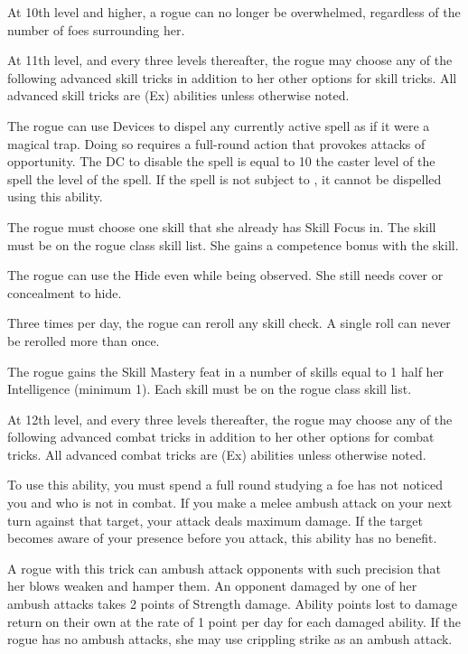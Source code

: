  At 10th level and higher, a rogue can no longer be overwhelmed, regardless of the number of foes surrounding her.

 At 11th level, and every three levels thereafter, the rogue may choose any of the following advanced skill tricks in addition to her other options for skill tricks. All advanced skill tricks are (Ex) abilities unless otherwise noted.

 The rogue can use Devices to dispel any currently active spell as if it were a magical trap. Doing so requires a full-round action that provokes attacks of opportunity. The DC to disable the spell is equal to 10 \add the caster level of the spell \add the level of the spell. If the spell is not subject to , it cannot be dispelled using this ability.

 The rogue must choose one skill that she already has Skill Focus in. The skill must be on the rogue class skill list. She gains a  competence bonus with the skill.

 The rogue can use the Hide even while being observed. She still needs cover or concealment to hide.

 Three times per day, the rogue can reroll any skill check. A single roll can never be rerolled more than once.

 The rogue gains the Skill Mastery feat in a number of skills equal to 1 \add half her Intelligence (minimum 1). Each skill must be on the rogue class skill list.

 At 12th level, and every three levels thereafter, the rogue may choose any of the following advanced combat tricks in addition to her other options for combat tricks. All advanced combat tricks are (Ex) abilities unless otherwise noted.

 To use this ability, you must spend a full round studying a foe has not noticed you and who is not in combat. If you make a melee ambush attack on your next turn against that target, your attack deals maximum damage. If the target becomes aware of your presence before you attack, this ability has no benefit.

 A rogue with this trick can ambush attack opponents with such precision that her blows weaken and hamper them. An opponent damaged by one of her ambush attacks takes 2 points of Strength damage. Ability points lost to damage return on their own at the rate of 1 point per day for each damaged ability. If the rogue has no ambush attacks, she may use crippling strike as an ambush attack.

